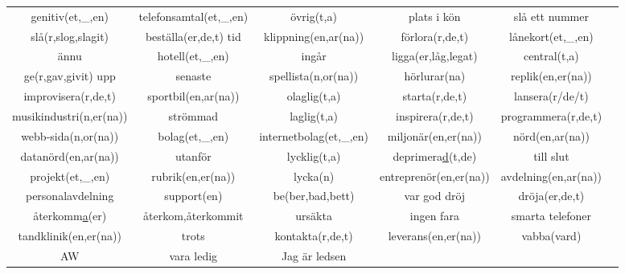 \begin{center}
\begin{adjustwidth}{-2.4cm}{}
\begin{tabular}{|c c c c c c|}
            genitiv(et,\_,en) & telefonsamtal(et,\_,en) & övrig(t,a) & plats i kön & slå ett nummer &  \\
            slå(r,slog,slagit) & beställa(er,de,t) tid & klippning(en,ar(na)) & förlora(r,de,t) & lånekort(et,\_,en) &  \\
            ännu & hotell(et,\_,en) & ingår & ligga(er,låg,legat) & central(t,a) &  \\
            ge(r,gav,givit) upp & senaste & spellista(n,or(na)) & hörlurar(na) & replik(en,er(na)) &  \\
            improvisera(r,de,t) & sportbil(en,ar(na)) & olaglig(t,a) & starta(r,de,t) & lansera(r/de/t) &  \\
            musikindustri(n,er(na)) & strömmad & laglig(t,a) & inspirera(r,de,t) & programmera(r,de,t) &  \\
            webb-sida(n,or(na)) & bolag(et,\_,en) & internetbolag(et,\_,en) & miljonär(en,er(na)) & nörd(en,ar(na)) &  \\
            datanörd(en,ar(na)) & utanför & lycklig(t,a) & deprimera\underline{d}(t,de) & till slut &  \\
            projekt(et,\_,en) & rubrik(en,er(na)) & lycka(n) & entreprenör(en,er(na)) & avdelning(en,ar(na)) &  \\
            personalavdelning & support(en) & be(ber,bad,bett) & var god dröj & dröja(er,de,t) &  \\
            återkomm\underline{a}(er) & återkom,återkommit & ursäkta & ingen fara & smarta telefoner &  \\
            tandklinik(en,er(na)) & trots & kontakta(r,de,t) & leverans(en,er(na)) & vabba(vard) &  \\
            AW & vara ledig & Jag är ledsen &  &  &  \\
            \hline
        \end{tabular}
    \end{adjustwidth}
\end{center}

